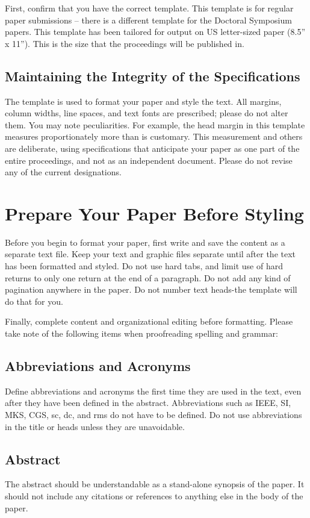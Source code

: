 \documentclass[conference, letter]{IEEEtran}
\begin{document}
First, confirm that you have the correct template. This template is for regular paper submissions – there is a different template for the Doctoral Symposium papers. This template has been tailored for output on US letter-sized paper (8.5” x 11”). This is the size that the proceedings will be published in.

\subsection{Maintaining the Integrity of the Specifications}

The template is used to format your paper and style the text. All margins, column widths, line spaces, and text fonts are prescribed; please do not alter them. You may note peculiarities. For example, the head margin in this template measures proportionately more than is customary. This measurement and others are deliberate, using specifications that anticipate your paper as one part of the entire proceedings, and not as an independent document. Please do not revise any of the current designations.

\section{Prepare Your Paper Before Styling}

Before you begin to format your paper, first write and save the content as a separate text file. Keep your text and graphic files separate until after the text has been formatted and styled. Do not use hard tabs, and limit use of hard returns to only one return at the end of a paragraph. Do not add any kind of pagination anywhere in the paper. Do not number text heads-the template will do that for you.

Finally, complete content and organizational editing before formatting. Please take note of the following items when proofreading spelling and grammar:


\subsection{Abbreviations and Acronyms}\label{AA}

Define abbreviations and acronyms the first time they are used in the text, even after they have been defined in the abstract. Abbreviations such as IEEE, SI, MKS, CGS, sc, dc, and rms do not have to be defined. Do not use abbreviations in the title or heads unless they are unavoidable.
\subsection{Abstract}
The abstract should be understandable as a stand-alone synopsis of the paper. It should not include any citations or references to anything else in the body of the paper.
\end{document}
